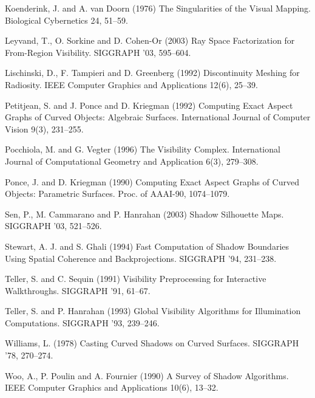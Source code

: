 \documentclass[9pt,twocolumn]{article}
\begin{document}
\begin{thebibliography}{99}
Koenderink, J. and A. van Doorn (1976)
The Singularities of the Visual Mapping.
Biological Cybernetics 24, 51--59.


Leyvand, T., O. Sorkine and D. Cohen-Or (2003)
Ray Space Factorization for From-Region Visibility.
SIGGRAPH '03, 595--604.

Lischinski, D., F. Tampieri and D. Greenberg (1992)
Discontinuity Meshing for Radiosity.
IEEE Computer Graphics and Applications 12(6), 25--39.

Petitjean, S. and J. Ponce and D. Kriegman (1992)
Computing Exact Aspect Graphs of Curved Objects: Algebraic Surfaces.
International Journal of Computer Vision 9(3), 231--255.


Pocchiola, M. and G. Vegter (1996)
The Visibility Complex.
International Journal of Computational Geometry and Application 6(3),
279--308.

Ponce, J. and D. Kriegman (1990)
Computing Exact Aspect Graphs of Curved Objects: Parametric Surfaces.
Proc. of AAAI-90, 1074--1079.

Sen, P., M. Cammarano and P. Hanrahan (2003)
Shadow Silhouette Maps.
SIGGRAPH '03, 521--526.


Stewart, A. J. and S. Ghali (1994)
Fast Computation of Shadow Boundaries Using Spatial Coherence and Backprojections.
SIGGRAPH '94, 231--238.

Teller, S. and C. Sequin (1991)
Visibility Preprocessing for Interactive Walkthroughs.
SIGGRAPH '91, 61--67.

Teller, S. and P. Hanrahan (1993)
Global Visibility Algorithms for Illumination Computations.
SIGGRAPH '93, 239--246.

Williams, L. (1978)
Casting Curved Shadows on Curved Surfaces.
SIGGRAPH '78, 270--274.

Woo, A., P. Poulin and A. Fournier (1990)
A Survey of Shadow Algorithms.
IEEE Computer Graphics and Applications 10(6), 13--32.


\end{thebibliography}
\end{document}
